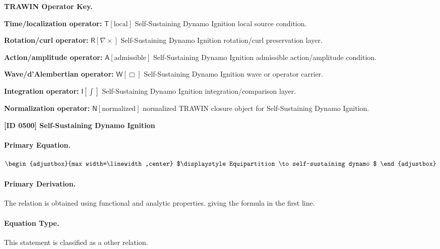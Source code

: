 \par\vspace{0.45\baselineskip}
\noindent\begin{minipage}[t]{\linewidth}
\begingroup
\small
\raggedright
\textbf{TRAWIN Operator Key.}\par
\noindent\textbf{Time/localization operator:} $\mathsf{T}\!\left[\mathrm{local}\right]$ Self-Sustaining Dynamo Ignition local source condition.\par
\noindent\textbf{Rotation/curl operator:} $\mathsf{R}\!\left[\nabla\times\right]$ Self-Sustaining Dynamo Ignition rotation/curl preservation layer.\par
\noindent\textbf{Action/amplitude operator:} $\mathsf{A}\!\left[\mathrm{admissible}\right]$ Self-Sustaining Dynamo Ignition admissible action/amplitude condition.\par
\noindent\textbf{Wave/d'Alembertian operator:} $\mathsf{W}\!\left[\Box\right]$ Self-Sustaining Dynamo Ignition wave or operator carrier.\par
\noindent\textbf{Integration operator:} $\mathsf{I}\!\left[\int\right]$ Self-Sustaining Dynamo Ignition integration/comparison layer.\par
\noindent\textbf{Normalization operator:} $\mathsf{N}\!\left[\mathrm{normalized}\right]$ normalized TRAWIN closure object for Self-Sustaining Dynamo Ignition.\par
\endgroup
\end{minipage}

\clearpage
\noindent\textbf{[ID 0500] Self-Sustaining Dynamo Ignition}\par
\vspace{0.35em}
\paragraph{Primary Equation.}
\[
\begin{adjustbox}{max width=\linewidth,center}
$\displaystyle
Equipartition \to self-sustaining dynamo
$
\end{adjustbox}
\]

\paragraph{Primary Derivation.}
The relation is obtained using functional and analytic properties. giving the formula in the first line.
\paragraph{Equation Type.}
This statement is classified as a other relation.

